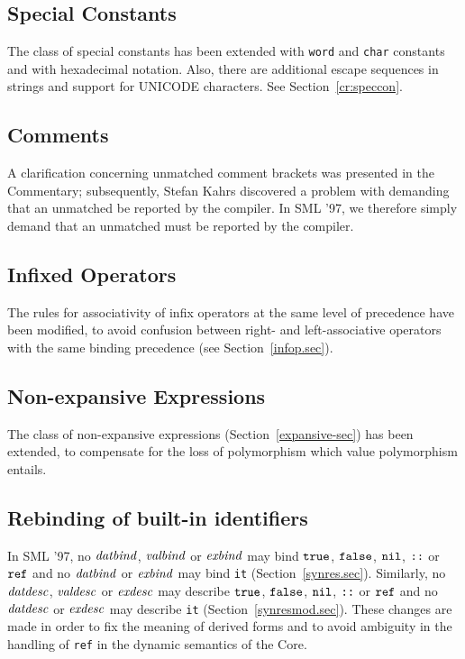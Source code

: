 \subsection{Special Constants}
The class of special constants has been extended with {\tt word}
and {\tt char} constants
and with hexadecimal notation. Also, there are
additional escape sequences in strings and support for UNICODE
characters. See Section~\ref{cr:speccon}.
%
\subsection{Comments}
A clarification concerning unmatched comment brackets was presented
in the Commentary; subsequently, Stefan Kahrs discovered a problem with
demanding that an unmatched \boxml{*)} be reported by the compiler.
In SML '97, we therefore simply demand that an unmatched 
\boxml{(*} must be reported by the compiler.

\subsection{Infixed Operators}
The rules for associativity of infix operators at the same level
of precedence have been modified, to avoid confusion between right- and left-associative
operators with the same binding precedence (see Section~\ref{infop.sec}). 

\subsection{Non-expansive Expressions}
\label{nonexpnew.sec}
The class of non-expansive expressions (Section~\ref{expansive-sec}) has been extended,
to compensate for the loss of polymorphism which value polymorphism
entails. 

\subsection{Rebinding of built-in identifiers}
In SML '97, no ${\it datbind\/}$, ${\it valbind}$ or ${\it exbind}$ may bind $\mbox{\tt true}$, $\mbox{\tt false}$,
$\hbox{\tt nil}$, $\hbox{\tt ::}$ or $\hbox{\tt ref}$  and no
${\it datbind\/}$ or ${\it exbind}$ may bind {\tt it} (Section~\ref{synres.sec}). 
Similarly, no ${\it datdesc}$, ${\it valdesc}$ or ${\it exdesc}$ 
may describe 
$\mbox{\tt true}$, $\mbox{\tt false}$,
$\hbox{\tt nil}$, $\hbox{\tt ::}$ or $\hbox{\tt ref}$  and no
${\it datdesc}$ or ${\it exdesc}$ may describe {\tt it}
(Section~\ref{synresmod.sec}).
These changes are made in order to fix the meaning of derived forms
and to avoid ambiguity in the handling of {\tt ref} in
the dynamic semantics of the Core.


